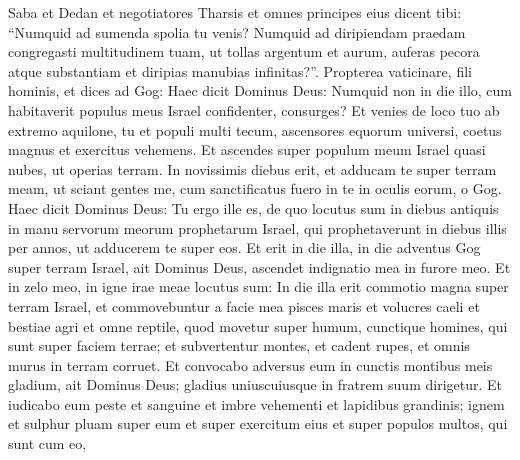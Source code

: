\begin{biblechapter}
\begin{biblechapter}
\begin{biblechapter}
\begin{biblechapter}
\begin{biblechapter}
\begin{biblechapter}
\begin{biblechapter}
\begin{biblechapter}
\begin{biblechapter}
\begin{biblechapter}
\begin{biblechapter}
\begin{biblechapter}
\begin{biblechapter}
\begin{biblechapter}
\begin{biblechapter}
\begin{biblechapter}
\begin{biblechapter}
\begin{biblechapter}
\begin{biblechapter}
\begin{biblechapter}
\begin{biblechapter}
\begin{biblechapter}
\begin{biblechapter}
\begin{biblechapter}
\begin{biblechapter}
\begin{biblechapter}
\begin{biblechapter}
\begin{biblechapter}
\begin{biblechapter}
\begin{biblechapter}
\begin{biblechapter}
\begin{biblechapter}
\begin{biblechapter}
\begin{biblechapter}
\begin{biblechapter}
\begin{biblechapter}
\begin{biblechapter}
\begin{biblechapter}
\verse Saba et Dedan et negotiatores Tharsis et omnes principes eius dicent tibi: “Numquid ad sumenda spolia tu venis? Numquid ad diripiendam praedam congregasti multitudinem tuam, ut tollas argentum et aurum, auferas pecora atque substantiam et diripias manubias infinitas?”.
 \verse Propterea vaticinare, fili hominis, et dices ad Gog: Haec dicit Dominus Deus: Numquid non in die illo, cum habitaverit populus meus Israel confidenter, consurges? 
\verse Et venies de loco tuo ab extremo aquilone, tu et populi multi tecum, ascensores equorum universi, coetus magnus et exercitus vehemens. 
\verse Et ascendes super populum meum Israel quasi nubes, ut operias terram. In novissimis diebus erit, et adducam te super terram meam, ut sciant gentes me, cum sanctificatus fuero in te in oculis eorum, o Gog.
 \verse Haec dicit Dominus Deus: Tu ergo ille es, de quo locutus sum in diebus antiquis in manu servorum meorum prophetarum Israel, qui prophetaverunt in diebus illis per annos, ut adducerem te super eos. 
\verse Et erit in die illa, in die adventus Gog super terram Israel, ait Dominus Deus, ascendet indignatio mea in furore meo. 
\verse Et in zelo meo, in igne irae meae locutus sum: In die illa erit commotio magna super terram Israel, 
\verse et commovebuntur a facie mea pisces maris et volucres caeli et bestiae agri et omne reptile, quod movetur super humum, cunctique homines, qui sunt super faciem terrae; et subvertentur montes, et cadent rupes, et omnis murus in terram corruet. 
\verse Et convocabo adversus eum in cunctis montibus meis gladium, ait Dominus Deus; gladius uniuscuiusque in fratrem suum dirigetur. 
\verse Et iudicabo eum peste et sanguine et imbre vehementi et lapidibus grandinis; ignem et sulphur pluam super eum et super exercitum eius et super populos multos, qui sunt cum eo, 

\end{biblechapter}
\end{biblechapter}
\end{biblechapter}
\end{biblechapter}
\end{biblechapter}
\end{biblechapter}
\end{biblechapter}
\end{biblechapter}
\end{biblechapter}
\end{biblechapter}
\end{biblechapter}
\end{biblechapter}
\end{biblechapter}
\end{biblechapter}
\end{biblechapter}
\end{biblechapter}
\end{biblechapter}
\end{biblechapter}
\end{biblechapter}
\end{biblechapter}
\end{biblechapter}
\end{biblechapter}
\end{biblechapter}
\end{biblechapter}
\end{biblechapter}
\end{biblechapter}
\end{biblechapter}
\end{biblechapter}
\end{biblechapter}
\end{biblechapter}
\end{biblechapter}
\end{biblechapter}
\end{biblechapter}
\end{biblechapter}
\end{biblechapter}
\end{biblechapter}
\end{biblechapter}
\end{biblechapter}
